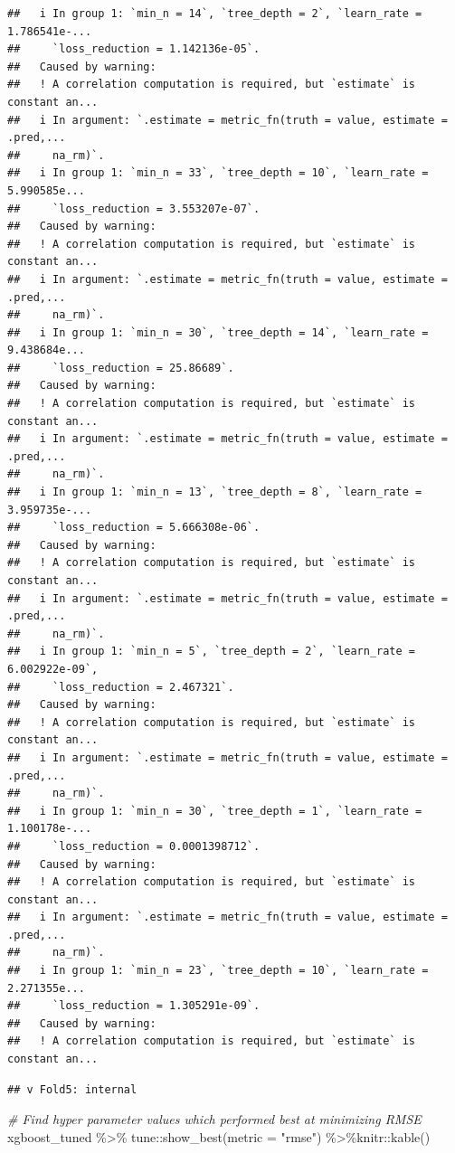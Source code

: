\documentclass[
]{article}
\newenvironment{Shaded}{\begin{snugshade}}{\end{snugshade}}
\newcommand{\AttributeTok}[1]{\textcolor[rgb]{0.77,0.63,0.00}{#1}}
\newcommand{\CommentTok}[1]{\textcolor[rgb]{0.56,0.35,0.01}{\textit{#1}}}
\newcommand{\FunctionTok}[1]{\textcolor[rgb]{0.00,0.00,0.00}{#1}}
\newcommand{\NormalTok}[1]{#1}
\newcommand{\SpecialCharTok}[1]{\textcolor[rgb]{0.00,0.00,0.00}{#1}}
\newcommand{\StringTok}[1]{\textcolor[rgb]{0.31,0.60,0.02}{#1}}
\begin{document}
\begin{verbatim}
##   i In group 1: `min_n = 14`, `tree_depth = 2`, `learn_rate = 1.786541e-...
##     `loss_reduction = 1.142136e-05`.
##   Caused by warning:
##   ! A correlation computation is required, but `estimate` is constant an...
##   i In argument: `.estimate = metric_fn(truth = value, estimate = .pred,...
##     na_rm)`.
##   i In group 1: `min_n = 33`, `tree_depth = 10`, `learn_rate = 5.990585e...
##     `loss_reduction = 3.553207e-07`.
##   Caused by warning:
##   ! A correlation computation is required, but `estimate` is constant an...
##   i In argument: `.estimate = metric_fn(truth = value, estimate = .pred,...
##     na_rm)`.
##   i In group 1: `min_n = 30`, `tree_depth = 14`, `learn_rate = 9.438684e...
##     `loss_reduction = 25.86689`.
##   Caused by warning:
##   ! A correlation computation is required, but `estimate` is constant an...
##   i In argument: `.estimate = metric_fn(truth = value, estimate = .pred,...
##     na_rm)`.
##   i In group 1: `min_n = 13`, `tree_depth = 8`, `learn_rate = 3.959735e-...
##     `loss_reduction = 5.666308e-06`.
##   Caused by warning:
##   ! A correlation computation is required, but `estimate` is constant an...
##   i In argument: `.estimate = metric_fn(truth = value, estimate = .pred,...
##     na_rm)`.
##   i In group 1: `min_n = 5`, `tree_depth = 2`, `learn_rate = 6.002922e-09`,
##     `loss_reduction = 2.467321`.
##   Caused by warning:
##   ! A correlation computation is required, but `estimate` is constant an...
##   i In argument: `.estimate = metric_fn(truth = value, estimate = .pred,...
##     na_rm)`.
##   i In group 1: `min_n = 30`, `tree_depth = 1`, `learn_rate = 1.100178e-...
##     `loss_reduction = 0.0001398712`.
##   Caused by warning:
##   ! A correlation computation is required, but `estimate` is constant an...
##   i In argument: `.estimate = metric_fn(truth = value, estimate = .pred,...
##     na_rm)`.
##   i In group 1: `min_n = 23`, `tree_depth = 10`, `learn_rate = 2.271355e...
##     `loss_reduction = 1.305291e-09`.
##   Caused by warning:
##   ! A correlation computation is required, but `estimate` is constant an...
\end{verbatim}

\begin{verbatim}
## v Fold5: internal
\end{verbatim}

\begin{Shaded}
\begin{Highlighting}[]
\CommentTok{\# Find hyper parameter values which performed best at minimizing RMSE}
\NormalTok{xgboost\_tuned }\SpecialCharTok{\%\textgreater{}\%}\NormalTok{ tune}\SpecialCharTok{::}\FunctionTok{show\_best}\NormalTok{(}\AttributeTok{metric =} \StringTok{"rmse"}\NormalTok{) }\SpecialCharTok{\%\textgreater{}\%}\NormalTok{knitr}\SpecialCharTok{::}\FunctionTok{kable}\NormalTok{()}
\end{Highlighting}
\end{Shaded}
\end{document}
